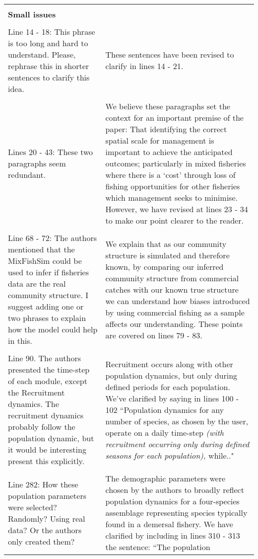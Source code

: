 \documentclass[10pt]{letter}
\begin{document}
\begin{center}
\begin{longtable}{p{8cm} | p{8cm}}
\hline
\\
\textbf{Small issues} &  \\
\\
Line 14 - 18: This phrase is too long and hard to understand. Please, rephrase
this in shorter sentences to clarify this idea. & These sentences have been
revised to clarify in lines 14 - 21.  \\
\\
Lines 20 - 43: These two paragraphs seem redundant. & We believe these
paragraphs set the context for an important premise of the paper: That
identifying the correct spatial scale for management is important to achieve
the anticipated outcomes; particularly in mixed fisheries where there is a
`cost' through loss of fishing opportunities for other fisheries which
management seeks to minimise. However, we have revised at lines 23 - 34 to make
our point clearer to the reader. \\
\\
Line 68 - 72: The authors mentioned that the MixFishSim could be used to infer
if fisheries data are the real community structure. I suggest adding one or two
phrases to explain how the model could help in this. & We explain that as our
community structure is simulated and therefore known, by comparing our inferred
community structure from commercial catches with our known true structure we
can understand how biases introduced by using commercial fishing as a sample
affects our understanding. These points are covered on lines 79 - 83.\\
\\
Line 90. The authors presented the time-step of each module, except the
Recruitment dynamics. The recruitment dynamics probably follow the population
dynamic, but it would be interesting present this explicitly. & Recruitment
occurs along with other population dynamics, but only during defined periods
for each population. We've clarified by saying in lines 100 - 102 ``Population
dynamics for any number of species, as chosen by the user, operate on a daily
time-step \textit{(with recruitment occurring only during defined seasons for
	each population),} while.."
\\
\\
Line 282: How these population parameters were selected? Randomly? Using real
data? Or the authors only created them? & The demographic parameters were
chosen by the authors to broadly reflect population dynamics for a four-species
assemblage representing species typically found in a demersal fishery. We have
clarified by including in lines 310 - 313 the sentence: ``The population

\end{longtable}
\end{center}
\end{document}

